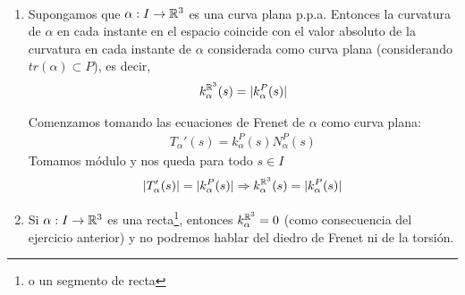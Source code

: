 \begin{ejercicio}\
    \begin{enumerate}
        \item Supongamos que $\alpha : I \to \mathbb{R}^3$ es una curva plana p.p.a. Entonces la curvatura de $\alpha$ en cada instante en el espacio coincide con el valor absoluto de la curvatura en cada instante de $\alpha$ considerada como curva plana (considerando $tr(\alpha)\subset P$), es decir, 
        \begin{gather*}
            k^{\mathbb{R}^3}_\alpha(s) = |k_\alpha^P(s)|
        \end{gather*}

        Comenzamos tomando las ecuaciones de Frenet de $\alpha$ como curva plana:
        \begin{gather*}
            T_\alpha'(s) = k_\alpha^P(s)N_\alpha^P(s)
        \end{gather*}
        Tomamos módulo y nos queda para todo $s\in I$
        \begin{gather*}
            |T'_\alpha (s)| = |k_\alpha^P(s)| \Rightarrow k^{\mathbb{R}^3}_\alpha(s) = |k_\alpha^P(s)|
        \end{gather*}

        \item Si $\alpha:I\to \mathbb{R}^3$ es una recta\footnote{o un segmento de recta}, entonces $k_\alpha^{\mathbb{R}^3} = 0$ (como consecuencia del ejercicio anterior) y no podremos hablar del diedro de Frenet ni de la torsión.
        

\end{enumerate}
\end{ejercicio}
